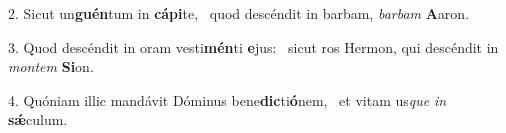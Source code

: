 2. Sicut un\textbf{guén}tum in \textbf{cá}\textbf{pi}te, \ast\  quod descéndit in barbam, \textit{bar}\textit{bam} \textbf{A}aron.\

3. Quod descéndit in oram vesti\textbf{mén}ti \textbf{e}jus: \ast\  sicut ros Hermon, qui descéndit in \textit{mon}\textit{tem} \textbf{Si}on.\

4. Quóniam illic mandávit Dóminus bene\textbf{dic}ti\textbf{ó}nem, \ast\  et vitam us\textit{que} \textit{in} \textbf{sǽ}culum.\

